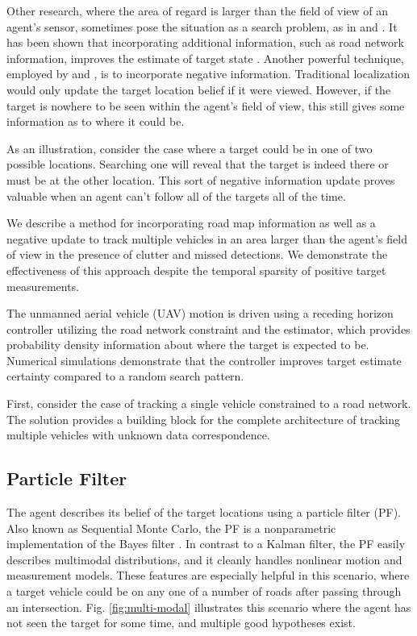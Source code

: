 \documentclass[letterpaper, 10 pt, conference]{ieeeconf}  %
\begin{document}
Other research, where the area of regard is larger than the field of view of an agent's sensor, sometimes pose the situation as a search problem, as in \cite{Allik2017} and \cite{Wong2005}. It has been shown that incorporating additional information, such as road network information, improves the estimate of target state \cite{Cheng2007}. Another powerful technique, employed by \cite{Allik2017} and \cite{Ahmed2017}, is to incorporate negative information. Traditional localization would only update the target location belief if it were viewed. However, if the target is nowhere to be seen within the agent's field of view, this still gives some information as to where it could be.

As an illustration, consider the case where a target could be in one of two possible locations. Searching one will reveal that the target is indeed there or must be at the other location. This sort of negative information update proves valuable when an agent can't follow all of the targets all of the time.

We describe a method for incorporating road map information as well as a negative update to track multiple vehicles in an area larger than the agent's field of view in the presence of clutter and missed detections. We demonstrate the effectiveness of this approach despite the temporal sparsity of positive target measurements.

The unmanned aerial vehicle (UAV) motion is driven using a receding horizon controller utilizing the road network constraint and the estimator, which provides probability density information about where the target is expected to be. Numerical simulations demonstrate that the controller improves target estimate certainty compared to a random search pattern.

First, consider the case of tracking a single vehicle constrained to a road network. The solution provides a building block for the complete architecture of tracking multiple vehicles with unknown data correspondence.

\subsection{Particle Filter}

The agent describes its belief of the target locations using a particle filter (PF). Also known as Sequential Monte Carlo, the PF is a nonparametric implementation of the Bayes filter \cite{Arulampalam2002}. In contrast to a Kalman filter, the PF easily describes multimodal distributions, and it cleanly handles nonlinear motion and measurement models. These features are especially helpful in this scenario, where a target vehicle could be on any one of a number of roads after passing through an intersection. Fig. \ref{fig:multi-modal} illustrates this scenario where the agent has not seen the target for some time, and multiple good hypotheses exist.
\end{document}
